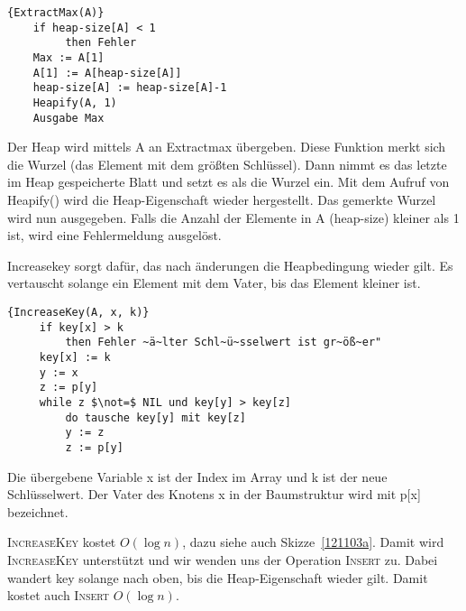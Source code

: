 \documentclass[ngerman,draft,parskip=half*,twoside]{scrreprt}
\theoremstyle{break}
\begin{document}
\begin{Algorithmus}[ht]
\begin{lstlisting}[frame=tlrb, mathescape=true, title=\textsc{ExtractMax\textnormal{(A)}}, gobble=4]{ExtractMax(A)}
    if heap-size[A] < 1
         then Fehler
    Max := A[1]
    A[1] := A[heap-size[A]]
    heap-size[A] := heap-size[A]-1
    Heapify(A, 1)
    Ausgabe Max
\end{lstlisting}

Der Heap wird mittels A an Extractmax übergeben. Diese Funktion merkt sich die Wurzel (das Element mit dem größten Schlüssel).
Dann nimmt es das letzte im Heap gespeicherte Blatt und setzt es als die Wurzel ein. Mit dem Aufruf von Heapify() wird die
Heap-Eigenschaft wieder hergestellt. Das gemerkte Wurzel wird nun ausgegeben.
Falls die Anzahl der Elemente in A (heap-size) kleiner als 1 ist, wird eine Fehlermeldung ausgelöst.
\end{Algorithmus}

Increasekey sorgt dafür, das nach änderungen die Heapbedingung wieder gilt. Es vertauscht solange ein Element mit dem Vater, bis
das Element kleiner ist.

\begin{Algorithmus}[ht]
\begin{lstlisting}[frame=tlrb, mathescape=true, title=\textsc{IncreaseKey\textnormal{(A, x, k)}}, gobble=4]{IncreaseKey(A, x, k)}
     if key[x] > k
         then Fehler ~ä~lter Schl~ü~sselwert ist gr~öß~er"    
     key[x] := k
     y := x
     z := p[y]
     while z $\not=$ NIL und key[y] > key[z]
         do tausche key[y] mit key[z]
         y := z
         z := p[y]
\end{lstlisting}

Die übergebene Variable x ist der Index im Array und k ist der neue Schlüsselwert. Der Vater des Knotens x in
der Baumstruktur wird mit p[x] bezeichnet.
\end{Algorithmus}
\textsc{IncreaseKey} kostet $O(\log n)$, dazu siehe auch Skizze~\ref{121103a}.
Damit wird \textsc{IncreaseKey} unterstützt und wir wenden uns der Operation \textsc{Insert} zu.
Dabei wandert key solange nach oben, bis die Heap-Eigenschaft wieder gilt. Damit kostet auch \textsc{Insert} $O(\log n)$.
\end{document}
